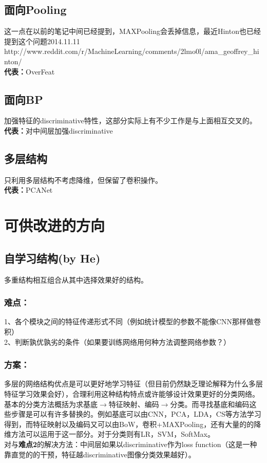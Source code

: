 \documentclass{article}
\begin{document}
\begin{CJK}{UTF8}{gbsn}
\subsection{面向Pooling}
这一点在以前的笔记中间已经提到，MAXPooling会丢掉信息，最近Hinton也已经提到这个问题2014.11.11 http://www.reddit.com/r/MachineLearning/comments/2lmo0l/ama\_geoffrey\_hinton/\\
\textbf{代表：}OverFeat\cite{sermanet2013overfeat}
\subsection{面向BP}
加强特征的discriminative特性，这部分实际上有不少工作是与上面相互交叉的。\\
\textbf{代表：}对中间层加强discriminative\cite{lee2014deeply}
\subsection{多层结构}
只利用多层结构不考虑降维，但保留了卷积操作。\\
\textbf{代表：}PCANet\cite{chan2014pcanet}
\section{可供改进的方向}
\subsection{自学习结构(by He)}
多重结构相互组合从其中选择效果好的结构。\\
\subsubsection{难点：}
1、各个模块之间的特征传递形式不同（例如统计模型的参数不能像CNN那样做卷积）\\
2、判断孰优孰劣的条件（如果要训练网络用何种方法调整网络参数？）\\
\subsubsection{方案：}
多层的网络结构优点是可以更好地学习特征（但目前仍然缺乏理论解释为什么多层特征学习效果会好），合理利用这种结构特点或许能够设计效果更好的分类网络。\\
基本的分类方法概括为求基底$\rightarrow$特征映射、编码$\rightarrow$分类。而寻找基底和编码这些步骤是可以有许多替换的。例如基底可以由CNN，PCA，LDA，CS等方法学习得到，而特征映射以及编码又可以由BoW，卷积+MAXPooling，还有大量的的降维方法可以运用于这一部分。对于分类则有LR，SVM，SoftMax。\\
对与\textbf{难点2}的解决方法：中间层如果以discriminative作为loss function（这是一种靠直觉的的干预，特征越discriminative图像分类效果越好）。\\

\end{CJK}
\end{document}
